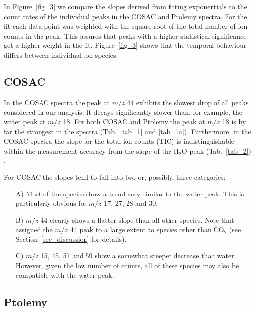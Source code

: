 \documentclass{aa}
\begin{document}
In Figure~\ref{fig_3} we compare the slopes derived from fitting exponentials to the count rates of 
the individual peaks in the COSAC and Ptolemy spectra.  For the fit each data point was weighted with 
the square root of the total number of ion counts in the peak. This assures that peaks with a
higher statistical significance get a higher weight in the  fit. 
Figure~\ref{fig_3} shows that the temporal behaviour differs 
between individual ion species.

\subsection{COSAC}

In the COSAC spectra the peak at $m/z$ 44 exhibits the slowest drop of all peaks considered in our 
analysis. It decays  
significantly slower than, for example, the water peak at $m/z$ 18. For both 
COSAC and Ptolemy  the peak at 
$m/z$ 18 is by far the strongest in the spectra (Tab.~\ref{tab_1} and \ref{tab_1a}). Furthermore, in 
the COSAC spectra the slope for the total 
ion counts (TIC) is indistinguishable within the measurement accuracy from the slope of the 
$\mathrm{H_2O}$ peak (Tab.~\ref{tab_2}) . 

For COSAC the slopes 
tend to fall into two or, possibly, three categories: 
\begin{itemize}
\item[A)] Most of the species show a trend very similar to the water peak. This is particularly obvious for $m/z$ 17, 27, 28 and 30. 
\item[B)] $m/z$ 44 clearly shows a flatter slope than all other species.
Note that \citet{goesmann2015} assigned the $m/z$ 44 peak to a large extent to species 
other than $\mathrm{CO_2}$ (see Section~\ref{sec_discussion} for details).
\item[C)] $m/z$ 15, 45, 57 and 59 show a somewhat steeper decrease than water. However, given the low number of counts, all 
 of these species may also be compatible with the water peak. 
\end{itemize}

\subsection{Ptolemy}
\end{document}
